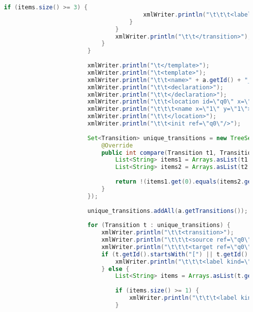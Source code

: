 \begin{lstlisting}[language=java, caption={példa unit teszteset.},captionpos=b]
									if (items.size() >= 3) {
										xmlWriter.println("\t\t\t<label kind=\"assignment\" x=\"" + t.getSender().getId().substring(1) + ".5\" y=\"" + t.getSender().getId().substring(1) + ".5\">" + items.get(2).replaceAll("&", "&amp;") + "</label>");
									}
								}
								xmlWriter.println("\t\t</transition>");
							}
						}
						
						xmlWriter.println("\t</template>");
						xmlWriter.println("\t<template>");
						xmlWriter.println("\t\t<name>" + a.getId() + "_environment</name>");
						xmlWriter.println("\t\t<declaration>");
						xmlWriter.println("\t\t</declaration>");
						xmlWriter.println("\t\t<location id=\"q0\" x=\"0\" y=\"0\">");
						xmlWriter.println("\t\t\t<name x=\"1\" y=\"1\">q0</name>");
						xmlWriter.println("\t\t</location>");
						xmlWriter.println("\t\t<init ref=\"q0\"/>");
						
						Set<Transition> unique_transitions = new TreeSet<Transition>(new Comparator<Transition>() {
							@Override
							public int compare(Transition t1, Transition t2) {
								List<String> items1 = Arrays.asList(t1.getId().split("\\s*;\\s*"));
								List<String> items2 = Arrays.asList(t2.getId().split("\\s*;\\s*"));
			
								return !(items1.get(0).equals(items2.get(0))) ? 1 : 0;
							}
						});
						
						unique_transitions.addAll(a.getTransitions());
						
						for (Transition t : unique_transitions) {
							xmlWriter.println("\t\t<transition>");
							xmlWriter.println("\t\t\t<source ref=\"q0\"/>");
							xmlWriter.println("\t\t\t<target ref=\"q0\"/>");
							if (t.getId().startsWith("[") || t.getId().startsWith("![")) {
								xmlWriter.println("\t\t\t<label kind=\"guard\" x=\"" + t.getSender().getId().substring(1) + ".5\" y=\"" + t.getSender().getId().substring(1) + ".5\">" + t.getId().substring(0, t.getId().indexOf("]")).replaceAll("<", "&lt;").replaceAll(">", "&gt;").replace("[", "") + "</label>");
							} else {
								List<String> items = Arrays.asList(t.getId().split("\\s*;\\s*"));
				
								if (items.size() >= 1) {
									xmlWriter.println("\t\t\t<label kind=\"synchronisation\" x=\"" + t.getSender().getId().substring(1) + ".5\" y=\"" + t.getSender().getId().substring(1) + ".5\">" + items.get(0).replaceAll("\\(", "_").replaceAll("\\)", "_").replaceAll("\\.", "__").replaceAll("!", "not").replaceAll("&", "_and_").replaceAll("\\s", "") + "!</label>");
								}
								

\end{lstlisting}
